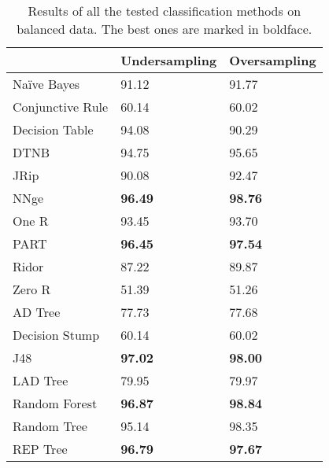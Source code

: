 \documentclass{llncs}
\begin{document}
\begin{table}[htpb]
\centering
 \caption{\label{tabresults_todos} Results of all the tested classification methods on balanced data. The best ones are marked in boldface.}
{\small
\begin{tabular}{|l|l|l|}
\cline{2-3}
\multicolumn{1}{l|}{} & Undersampling & Oversampling \\ 
\hline
Naïve Bayes & 91.12 & 91.77 \\ 
\hline
Conjunctive Rule & 60.14 & 60.02 \\ 
\cline{1-1}
Decision Table & 94.08 & 90.29 \\ 
\cline{1-1}
DTNB & 94.75 & 95.65 \\ 
\cline{1-1}
JRip & 90.08 & 92.47 \\ 
\cline{1-1}
NNge & \textbf{96.49} & \textbf{98.76} \\ 
\cline{1-1}
One R & 93.45 & 93.70 \\ 
\cline{1-1}
PART & \textbf{96.45} & \textbf{97.54} \\ 
\cline{1-1}
Ridor & 87.22 & 89.87 \\ 
\cline{1-1}
Zero R & 51.39 & 51.26 \\ 
\cline{1-1}
AD Tree & 77.73 & 77.68 \\ 
\cline{1-1}
Decision Stump & 60.14 & 60.02 \\ 
\cline{1-1}
J48 & \textbf{97.02} & \textbf{98.00} \\ 
\cline{1-1}
LAD Tree & 79.95 & 79.97 \\ 
\cline{1-1}
Random Forest & \textbf{96.87} & \textbf{98.84} \\ 
\cline{1-1}
Random Tree & 95.14 & 98.35 \\ 
\cline{1-1}
REP Tree & \textbf{96.79} & \textbf{97.67} \\ 
\hline
\end{tabular}
}
\end{table}
\end{document}
